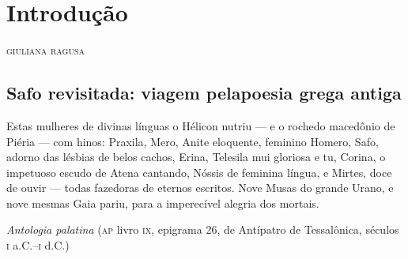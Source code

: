 \chapter[Introdução, \emph{por Giuliana Ragusa} \medskip]{Introdução}

\begin{flushright}
\textsc{giuliana ragusa}
\end{flushright}

\section*{Safo revisitada: viagem pela\break poesia grega
antiga}

\epigraph{Estas mulheres de divinas línguas o Hélicon nutriu --- e o  %
rochedo macedônio de Piéria --- com hinos: %
Praxila, Mero, Anite eloquente, feminino Homero, %
Safo, adorno das lésbias de belos cachos, %
Erina, Telesila mui gloriosa e tu, Corina, %
o impetuoso escudo de Atena cantando, %
Nóssis de feminina língua, e Mirtes, doce de ouvir ---  %
todas fazedoras de eternos escritos. %
Nove Musas do grande Urano, e nove mesmas %
Gaia pariu, para a imperecível alegria dos mortais.}
{\textit{Antologia palatina} (\textsc{ap} livro \textsc{ix}, epigrama 26, de Antípatro de Tessalônica,
séculos \textsc{i} a.C.--\textsc{i} d.C.)\footnotemark}



